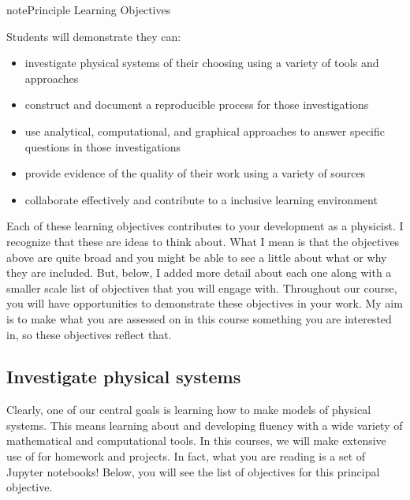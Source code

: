 \documentclass[letterpaper,10pt,english]{jupyterBook}
\begin{document}
\begin{sphinxadmonition}{note}{Principle Learning Objectives}

\sphinxAtStartPar
Students will demonstrate they can:
\begin{itemize}
\item {} 
\sphinxAtStartPar
investigate physical systems of their choosing using a variety of tools and approaches

\item {} 
\sphinxAtStartPar
construct and document a reproducible process for those investigations

\item {} 
\sphinxAtStartPar
use analytical, computational, and graphical approaches to answer specific questions in those investigations

\item {} 
\sphinxAtStartPar
provide evidence of the quality of their work using a variety of sources

\item {} 
\sphinxAtStartPar
collaborate effectively and contribute to a inclusive learning environment

\end{itemize}
\end{sphinxadmonition}

\sphinxAtStartPar
Each of these learning objectives contributes to your development as a physicist. I recognize that these are  ideas to think about. What I mean is that the objectives above are quite broad and you might be able to see a little about what or why they are included. But, below, I added more detail about each one along with a smaller scale list of objectives that you will engage with. Throughout our course, you will have opportunities to demonstrate these objectives in your work. My aim is to make what you are assessed on in this course something you are interested in, so these objectives reflect that.


\subsection{Investigate physical systems}
\label{\detokenize{content/0_course/goals:investigate-physical-systems}}
\sphinxAtStartPar
Clearly, one of our central goals is learning how to make models of physical systems. This means learning about and developing fluency with a wide variety of mathematical and computational tools. In this courses, we will make extensive use of  for homework and projects. In fact, what you are reading is a set of Jupyter notebooks! Below, you will see the list of objectives for this principal objective.
\end{document}
